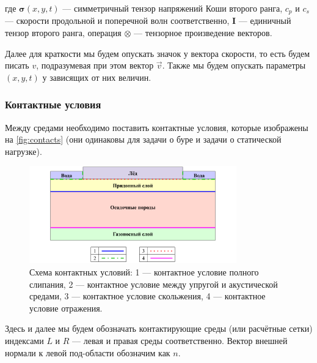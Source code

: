 где $\pmb{\sigma}(x,y,t)$ --- симметричный тензор напряжений Коши второго ранга, $c_p$ и $c_s$ --- скорости продольной и поперечной волн соответственно, $\pmb{I}$ --- единичный тензор второго ранга, операция $\otimes$ --- тензорное произведение векторов.

Далее для краткости мы будем опускать значок у вектора скорости, то есть будем писать $v$, подразумевая при этом вектор $\vec{v}$. Также мы будем опускать параметры $(x,y,t)$ у зависящих от них величин.

\subsubsection{Контактные условия}

Между средами необходимо поставить контактные условия, которые изображены на \autoref{fig:contacts} (они одинаковы для задачи о буре и задачи о статической нагрузке).

\begin{figure}[htb]
    \centering
    \includegraphics[width=0.8\textwidth]
    {images/gas_field/contacts.png}
    \caption{Схема контактных условий: 1 --- контактное условие полного слипания, 2 --- контактное условие между упругой и акустической средами, 3 --- контактное условие скольжения, 4 --- контактное условие отражения.}
    \label{fig:contacts}
\end{figure}

Здесь и далее мы будем обозначать контактирующие среды (или расчётные сетки) индексами $L$ и $R$ --- левая и правая среды соответственно. Вектор внешней нормали к левой под-области обозначим как $n$.

